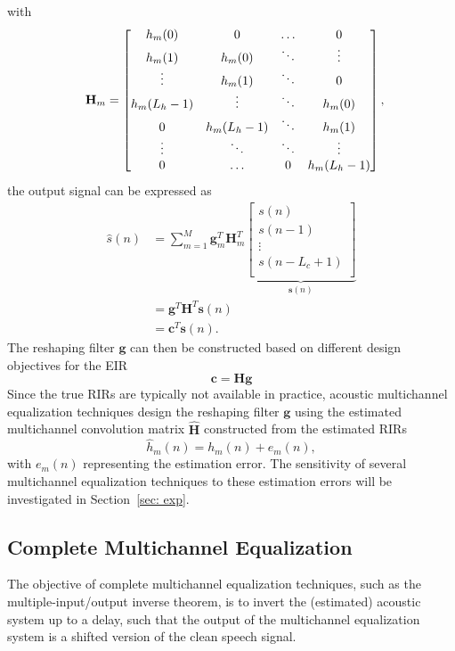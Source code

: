 \documentclass[draftcls,onecolumn,11pt]{IEEEtran}
\begin{document}
with
\begin{equation}
\hspace{-0.2cm}
\mathbf{H}_m =  \begin{bmatrix}
    h_m(0) & 0 &  \ldots & 0 \\
    h_m(1) & h_m(0) & \ddots & \vdots \\
    \vdots & h_m(1) & \ddots & 0 \\
    h_m(L_h-1) & \vdots & \ddots & h_m(0) \\
    0 & h_m(L_h-1) & \ddots & h_m(1) \\
    \vdots & \ddots & \ddots & \vdots \\
    0 & \ldots & 0 & h_m(L_h-1)
   \end{bmatrix},\hspace{-0.4cm}
 \end{equation}
the output signal can be expressed as
\begin{align}
\hat{s}(n) &=  \sum_{m=1}^{M} \mathbf{g}_m^T
 \mathbf{H}_m^T
\underbrace{\left[
\begin{array}{c}
s(n) \\
s(n-1) \\
\vdots \\
s(n-L_c+1) \\
\end{array}
\right]}_{\mathbf{s}(n)}  \\
& =  \mathbf{g}^T \mathbf{H}^T \mathbf{s}(n) \\
& =  \mathbf{c}^T \mathbf{s}(n).
\end{align}
The reshaping filter $\mathbf{g}$ can then be constructed based on different design objectives for the EIR
\begin{equation}
\boxed{\mathbf{c} = \mathbf{H}\mathbf{g}}
\end{equation}
Since the true RIRs are typically not available in practice, acoustic multichannel equalization techniques design the reshaping filter $\mathbf{g}$ using the estimated multichannel convolution matrix $\hat{\mathbf{H}}$ constructed from the estimated RIRs
\begin{equation}
\label{eq: hath}
\hat{h}_m(n) = h_m(n) + e_m(n),
\end{equation}
with $e_m(n)$ representing the estimation error.
The sensitivity of several multichannel equalization techniques to these estimation errors will be investigated in Section~\ref{sec: exp}.


\subsection{Complete Multichannel Equalization}
\label{subsec: mint}
The objective of complete multichannel equalization techniques, such as the multiple-input/output inverse theorem, is to invert the (estimated) acoustic system up to a delay, such that the output of the multichannel equalization system is a shifted version of the clean speech signal.
\end{document}
